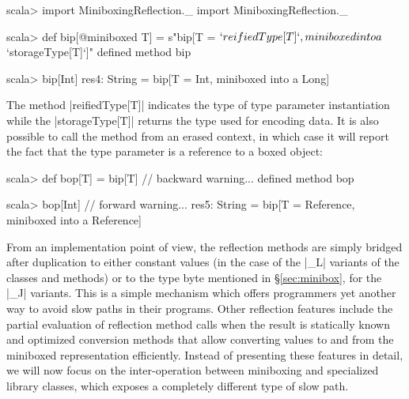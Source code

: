 \begin{lstlisting-nobreak}
 scala> import MiniboxingReflection._
 import MiniboxingReflection._

 scala> def bip[@miniboxed T] = s"bip[T = ${`reifiedType[T]`}, miniboxed into a ${`storageType[T]`}]"
 defined method bip

 scala> bip[Int]
 res4: String = bip[T = Int, miniboxed into a Long]
\end{lstlisting-nobreak}

The method |reifiedType[T]| indicates the type of type parameter instantiation while the |storageType[T]| returns the type used for encoding data. It is also possible to call the method from an erased context, in which case it will report the fact that the type parameter is a reference to a boxed object:

\begin{lstlisting-nobreak}
 scala> def bop[T] = bip[T]
 // backward warning...
 defined method bop

 scala> bop[Int]
 // forward warning...
 res5: String = bip[T = Reference, miniboxed into a Reference]
\end{lstlisting-nobreak}

From an implementation point of view, the reflection methods are simply bridged after duplication to either constant values (in the case of the |_L| variants of the classes and methods) or to the type byte mentioned in \S\ref{sec:minibox}, for the |_J| variants. This is a simple mechanism which offers programmers yet another way to avoid slow paths in their programs.  Other reflection features include the partial evaluation of reflection method calls when the result is statically known and optimized conversion methods that allow converting values to and from the miniboxed representation efficiently. Instead of presenting these features in detail, we will now focus on the inter-operation between miniboxing and specialized library classes, which exposes a completely different type of slow path.